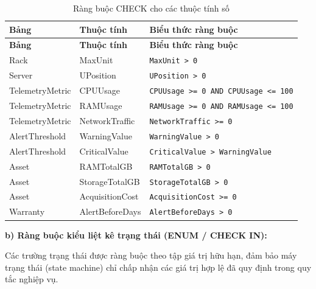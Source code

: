 \begin{longtable}{|l|l|p{6cm}|}
\caption{Ràng buộc CHECK cho các thuộc tính số} \label{tab:check_numeric} \\
\hline
\textbf{Bảng} & \textbf{Thuộc tính} & \textbf{Biểu thức ràng buộc} \\ \hline
\endfirsthead
\hline
\textbf{Bảng} & \textbf{Thuộc tính} & \textbf{Biểu thức ràng buộc} \\ \hline
\endhead
\hline
\endfoot
Rack & MaxUnit & \texttt{MaxUnit > 0} \\ \hline
Server & UPosition & \texttt{UPosition > 0} \\ \hline
TelemetryMetric & CPUUsage & \texttt{CPUUsage >= 0 AND CPUUsage <= 100} \\ \hline
TelemetryMetric & RAMUsage & \texttt{RAMUsage >= 0 AND RAMUsage <= 100} \\ \hline
TelemetryMetric & NetworkTraffic & \texttt{NetworkTraffic >= 0} \\ \hline
AlertThreshold & WarningValue & \texttt{WarningValue > 0} \\ \hline
AlertThreshold & CriticalValue & \texttt{CriticalValue > WarningValue} \\ \hline
Asset & RAMTotalGB & \texttt{RAMTotalGB > 0} \\ \hline
Asset & StorageTotalGB & \texttt{StorageTotalGB > 0} \\ \hline
Asset & AcquisitionCost & \texttt{AcquisitionCost >= 0} \\ \hline
Warranty & AlertBeforeDays & \texttt{AlertBeforeDays > 0} \\ \hline
\end{longtable}

\vspace{0.5em}
\noindent\textbf{b) Ràng buộc kiểu liệt kê trạng thái (ENUM / CHECK IN):}

Các trường trạng thái được ràng buộc theo tập giá trị hữu hạn, đảm bảo máy trạng thái (state machine) chỉ chấp nhận các giá trị hợp lệ đã quy định trong quy tắc nghiệp vụ.

